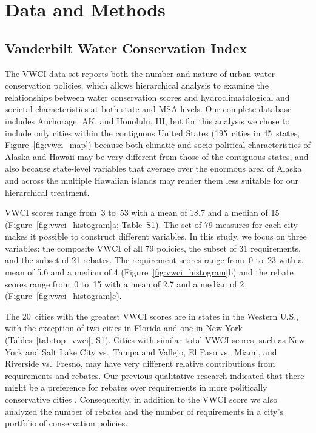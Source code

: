 \documentclass[draft,linenumbers]{agujournal}
\begin{document}
\section{Data and Methods}
\label{sec:data.methods}
\subsection{Vanderbilt Water Conservation Index}
%
%
%

%
%



The VWCI data set reports both the number and
nature of urban water conservation policies, which  allows hierarchical analysis
to examine the relationships between water conservation scores and
hydroclimatological and societal characteristics at both state and MSA levels.
Our complete database includes Anchorage, AK, and Honolulu, HI, but for this
analysis we chose to include only cities within the contiguous United States
(195~cities in 45~states,
Figure~\ref{fig:vwci_map})
because both
climatic and socio-political characteristics of Alaska and Hawaii may be very
different from those of the contiguous states, and also because state-level
variables that average over the enormous area of Alaska and across the multiple
Hawaiian islands may render them less suitable for our hierarchical treatment.

VWCI scores range from~3
to~53
with a mean of  18.7
and a median of 15
(Figure~\ref{fig:vwci_histogram}a; Table~S1).
The set of 79 measures for each city makes it possible to construct different variables.
In this study, we focus on three variables: the composite VWCI of all 79 policies,
the subset of 31 requirements, and the subset of 21 rebates.
The requirement scores range
from~0
to~23
with a mean of 5.6
and a median of 4
(Figure~\ref{fig:vwci_histogram}b)
and the rebate scores range
from~0
to~15
with a mean of 2.7
and a median of 2
(Figure~\ref{fig:vwci_histogram}c).
%
%

The 20~cities with the greatest VWCI scores are in states in the
Western U.S., with the exception of two cities in Florida and one in New York
(Tables~\ref{tab:top_vwci}, S1). Cities with similar total VWCI scores, such as
New York and Salt Lake City vs.\ Tampa and Vallejo, El Paso vs.\ Miami, and
Riverside vs.\ Fresno, may have very different relative contributions from
requirements and rebates.
Our previous qualitative research
indicated that there might be a preference for rebates over requirements in more
politically conservative cities \citep{hess:drought:2016,brown:politics:2016}.
Consequently, in addition to the VWCI score we also analyzed the number of
rebates and the number of requirements in a city's portfolio of conservation
policies.
\end{document}
